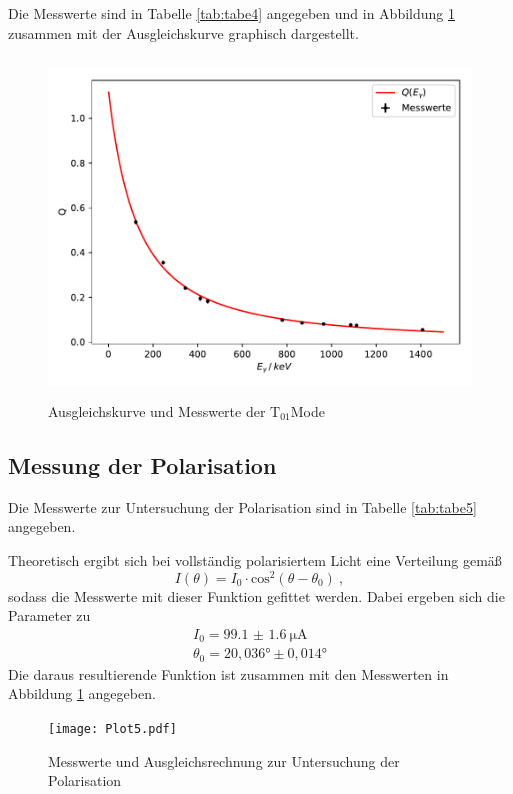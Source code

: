 Die Messwerte sind in Tabelle \ref{tab:tabe4} angegeben und in Abbildung \ref{fig:plot4}
zusammen mit der Ausgleichskurve graphisch dargestellt.

\begin{figure}[H]
  \centering
  \includegraphics[height=9cm]{Plot4.pdf}
  \caption{Ausgleichskurve und Messwerte der $\text{T}_{01}$Mode}
  \label{fig:plot4}
\end{figure}

\subsection{Messung der Polarisation}
Die Messwerte zur Untersuchung der Polarisation sind in Tabelle \ref{tab:tabe5} angegeben.

Theoretisch ergibt sich bei vollständig polarisiertem Licht eine Verteilung gemäß
\begin{equation}
  I(\theta) = I_0 \cdot \text{cos}^2(\theta-\theta_0) \:,
\end{equation}
sodass die Messwerte mit dieser Funktion gefittet werden. Dabei ergeben sich die Parameter zu
\begin{align*}
  I_0= \SI{99.1(16)}{\micro\ampere} \\
  \theta_0 = 20,036° \pm 0,014°
\end{align*}
Die daraus resultierende Funktion ist zusammen mit den Messwerten in Abbildung \ref{fig:plot4}
angegeben.
\begin{figure}
  \centering
  \texttt{[image: Plot5.pdf]}
  \caption{Messwerte und Ausgleichsrechnung zur Untersuchung der Polarisation}
  \label{fig:plot5}
\end{figure}

